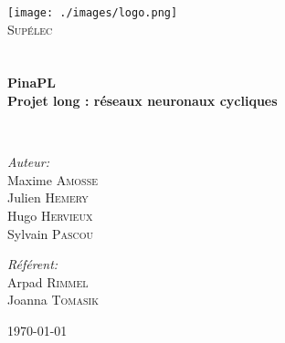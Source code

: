 
\begin{titlepage}
\begin{center}

\texttt{[image: ./images/logo.png]}~\\[1cm]

\textsc{\LARGE Supélec}\\[1.5cm]

\textsc{\Large }\\[0.5cm]

\HRule
\\[0.4cm]

{\huge \bfseries PinaPL\\
Projet long : réseaux neuronaux cycliques \\[0.4cm] }

\HRule
\\[1.5cm]

\begin{minipage}{0.4\textwidth}
\begin{flushleft} \large
\emph{Auteur:}\\
Maxime \textsc{Amosse}\\
Julien \textsc{Hemery}\\
Hugo \textsc{Hervieux}\\
Sylvain \textsc{Pascou}
\end{flushleft}
\end{minipage}
\begin{minipage}{0.4\textwidth}
\begin{flushright} \large
\emph{Référent:} \\
Arpad \textsc{Rimmel} \\
Joanna \textsc{Tomasik}
\end{flushright}
\end{minipage}

\vfill

{\large \today}

\end{center}
\end{titlepage}
